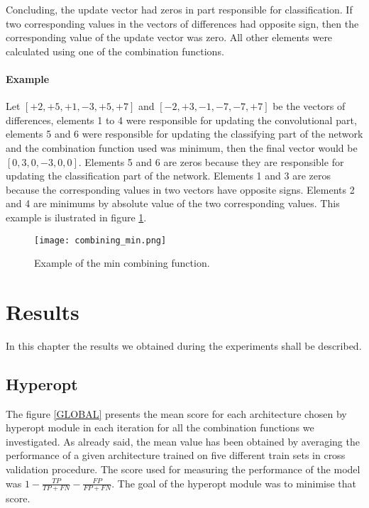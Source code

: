 \documentclass[a4paper,10pt]{report}
\begin{document}
      Concluding, the update vector had zeros in part responsible for classification. If two corresponding values in the vectors of differences had opposite sign, then the corresponding value of the update vector was zero. All other elements were calculated using one of the combination functions. 
      
      \subsubsection{Example}
      Let $[+2, +5, +1, -3, +5, +7]$ and $[-2, +3, -1, -7, -7, +7]$ be the vectors of differences, elements 1 to 4 were responsible for updating the convolutional part, elements 5 and 6 were responsible for updating the classifying part of the network and the combination function used was minimum, then the final vector would be $[0, 3, 0, -3, 0, 0]$. Elements 5 and 6 are zeros because they are responsible for updating the classification part of the network. Elements 1 and 3 are zeros because the corresponding values in two vectors have opposite signs. Elements 2 and 4 are minimums by absolute value of the two corresponding values. This example is ilustrated in figure \ref{fig:combining}. 
      
      \begin{figure}[h!]
	  \centering
	  \texttt{[image: combining\_min.png]}
	  \caption{Example of the min combining function.}
	  \label{fig:combining}
	\end{figure} 
	
   \chapter{Results}
    In this chapter the results we obtained during the experiments shall be described.
   
   \section{Hyperopt}
   
    The figure \ref{GLOBAL} presents the mean score for each architecture chosen by hyperopt module in each iteration for all the combination functions we investigated. As already said, the mean value has been obtained by averaging the performance of a given architecture trained on five different train sets in cross validation procedure. The score used for measuring the performance of the model was $1-\frac{TP}{TP + FN} - \frac{FP}{FP + FN}$. The goal of the hyperopt module was to minimise that score.
    
\end{document}
